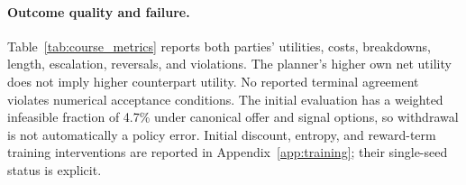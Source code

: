 \paragraph{Outcome quality and failure.}
Table~\ref{tab:course_metrics} reports both parties' utilities, costs, breakdowns, length, escalation, reversals, and violations. The planner's higher own net utility does not imply higher counterpart utility. No reported terminal agreement violates numerical acceptance conditions. The initial evaluation has a weighted infeasible fraction of 4.7\% under canonical offer and signal options, so withdrawal is not automatically a policy error. Initial discount, entropy, and reward-term training interventions are reported in Appendix~\ref{app:training}; their single-seed status is explicit.
